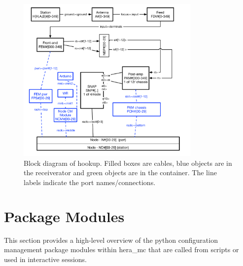 \documentclass{article}[10pt]
\begin{document}
\begin{figure}[H]
\includegraphics[width=0.8\textwidth]{hookup.pdf}
\centering
\caption{Block diagram of hookup.  Filled boxes are cables, blue objects are in the receiverator and green objects are in the container.
The line labels indicate the port names/connections.}
\label{fig:hookup}
\end{figure}

\section{Package Modules}
This section provides a high-level overview of the python configuration management package modules within hera\_mc that are called from scripts or used in interactive sessions.
\vspace{0.5cm}
\end{document}

